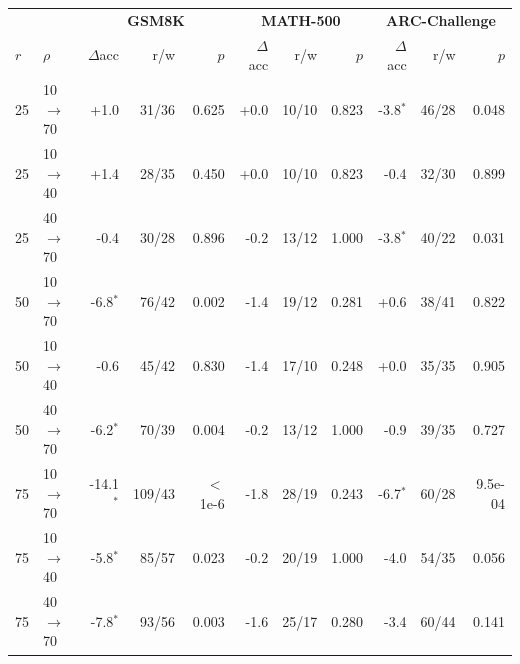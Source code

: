 \begin{tabular}{ll rrr rrr rrr}
\toprule
& & \multicolumn{3}{c}{\textbf{GSM8K}} & \multicolumn{3}{c}{\textbf{MATH-500}} & \multicolumn{3}{c}{\textbf{ARC-Challenge}} \\
\cmidrule(lr){3-5}\cmidrule(lr){6-8}\cmidrule(lr){9-11}
\textbf{$r$} & \textbf{$\rho$} & $\Delta$acc & r/w & $p$ & $\Delta$acc & r/w & $p$ & $\Delta$acc & r/w & $p$ \\
\midrule
25 & 10$\to$70 & +1.0 & 31/36 & 0.625 & +0.0 & 10/10 & 0.823 & -3.8$^{*}$ & 46/28 & 0.048 \\
25 & 10$\to$40 & +1.4 & 28/35 & 0.450 & +0.0 & 10/10 & 0.823 & -0.4 & 32/30 & 0.899 \\
25 & 40$\to$70 & -0.4 & 30/28 & 0.896 & -0.2 & 13/12 & 1.000 & -3.8$^{*}$ & 40/22 & 0.031 \\
50 & 10$\to$70 & -6.8$^{*}$ & 76/42 & 0.002 & -1.4 & 19/12 & 0.281 & +0.6 & 38/41 & 0.822 \\
50 & 10$\to$40 & -0.6 & 45/42 & 0.830 & -1.4 & 17/10 & 0.248 & +0.0 & 35/35 & 0.905 \\
50 & 40$\to$70 & -6.2$^{*}$ & 70/39 & 0.004 & -0.2 & 13/12 & 1.000 & -0.9 & 39/35 & 0.727 \\
75 & 10$\to$70 & -14.1$^{*}$ & 109/43 & $<$1e-6 & -1.8 & 28/19 & 0.243 & -6.7$^{*}$ & 60/28 & 9.5e-04 \\
75 & 10$\to$40 & -5.8$^{*}$ & 85/57 & 0.023 & -0.2 & 20/19 & 1.000 & -4.0 & 54/35 & 0.056 \\
75 & 40$\to$70 & -7.8$^{*}$ & 93/56 & 0.003 & -1.6 & 25/17 & 0.280 & -3.4 & 60/44 & 0.141 \\
\bottomrule
\end{tabular}